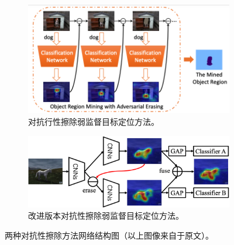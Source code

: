 \begin{figure}[h!]
	\centering
	\begin{subfigure}{0.38\textwidth}
		\centering
		\includegraphics[width=1\textwidth]{figure/adversarial_erasing}
        \caption{对抗行性擦除弱监督目标定位方法。}
		\label{subfig:adversarial_erasing}
	\end{subfigure}
	\begin{subfigure}{0.57\textwidth}
		\centering
		\includegraphics[width=1.0\textwidth]{figure/improved_adversarial_learning}
		\caption{改进版本对抗性擦除弱监督目标定位方法。}
		\label{subfig:improved_adversarial_learning}
	\end{subfigure}
	\caption{两种对抗性擦除方法网络结构图（以上图像来自于原文）。}
	\label{mul_fig:weakly_supervised_localization}
\end{figure}

